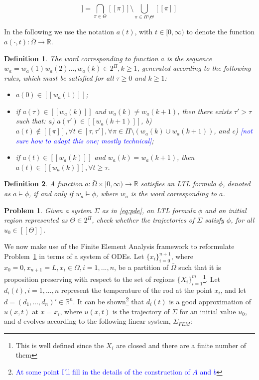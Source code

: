 \documentclass{article}
\newtheorem{definition}{Definition}
\newtheorem{problem}{Problem}
\newcommand*{\R}{\mathbb{R}}
\newcommand*{\psat}[1]{[[#1]]}
\newcommand*{\fran}[1]{\textcolor{blue}{#1}}
\begin{document}
\begin{equation}
    \psat{\Theta} = \bigcap_{\pi \in \Theta} \psat{\pi} \setminus 
    \bigcup_{\pi \in \Pi \setminus \Theta} \psat{\pi}
\end{equation}

In the following we use the notation $a(t)$, with $t \in [0, \infty)$ to denote
the function $a(\cdot , t) : \bar\Omega \rightarrow \R$.

\begin{definition}\label{def:word}
    The word corresponding to function $a$ is the sequence $w_a = w_a(1)
    w_a(2)..., w_a(k) \in 2^\Pi, k \geq 1$, generated according to the following
    rules, which must be satisfied for all $\tau \geq 0$ and $k \geq 1$:

    \begin{itemize}
        \item $a(0) \in \psat{w_a(1)}$;
        \item if $a(\tau) \in \psat{w_a(k)}$ and $w_a(k) \neq w_a(k + 1)$, then
            there exists $\tau' > \tau$ such that: a) $a(\tau') \in \psat{w_a(k
            + 1)}$, b) $a(t) \notin \psat{\pi}, \forall t \in [\tau, \tau'], \forall \pi \in
            \Pi \setminus (w_a(k) \cup w_a(k + 1))$, and c) \fran{[not sure how
            to adapt this one; mostly technical]};
        \item if $a(t) \in \psat{w_a(k)}$ and $w_a(k) = w_a(k + 1)$, then $a(t) \in
        \psat{w_a(k)}, \forall t \geq \tau$.
    \end{itemize}
\end{definition}

\begin{definition}\label{def:sat}
    A function $a : \bar \Omega \times [0, \infty) \rightarrow \R$ satisfies an
        LTL formula $\phi$, denoted as $a \models \phi$, if and only if $w_a
        \models \phi$, where $w_a$ is the word corresponding to $a$.
\end{definition}

\begin{problem}\label{pr:pde}
    Given a system $\Sigma$ as in \eqref{eq:pde}, an LTL formula $\phi$ and an
    initial region represented as $\Theta \in 2^\Pi$, check whether the trajectories of $\Sigma$
    satisfy $\phi$, for all $u_0 \in \psat{\Theta}$.
\end{problem}

We now make use of the Finite Element Analysis framework to reformulate
Problem~\ref{pr:pde} in terms of a system of ODEs. Let $\{x_i\}_{i = 0}^{n +
1}$, where $x_0 = 0, x_{n+1} = L, x_i \in \Omega, i = 1,...,n$, be a partition of
$\bar\Omega$ such that it is proposition preserving with respect to the set of
regions $\{X_i\}_{i = 1}^{m}$\footnote{This is well defined since the $X_i$ are
closed and there are a finite number of them}. Let $d_i(t), i = 1,...,n$ represent the
temperature of the rod at the point $x_i$, and let $d = (d_1, ..., d_n)' \in
\R^n$. It can be shown\footnote{\fran{At some point I'll fill in the details of the
construction of $A$ and $b$}} that $d_i(t)$ is a good approximation of 
$u(x, t)$ at $x=x_i$, where $u(x,t)$ is the trajectory of $\Sigma$ for an
initial value $u_0$, and $d$ evolves
according to the following linear system, $\Sigma_{FEM}$:
\end{document}
